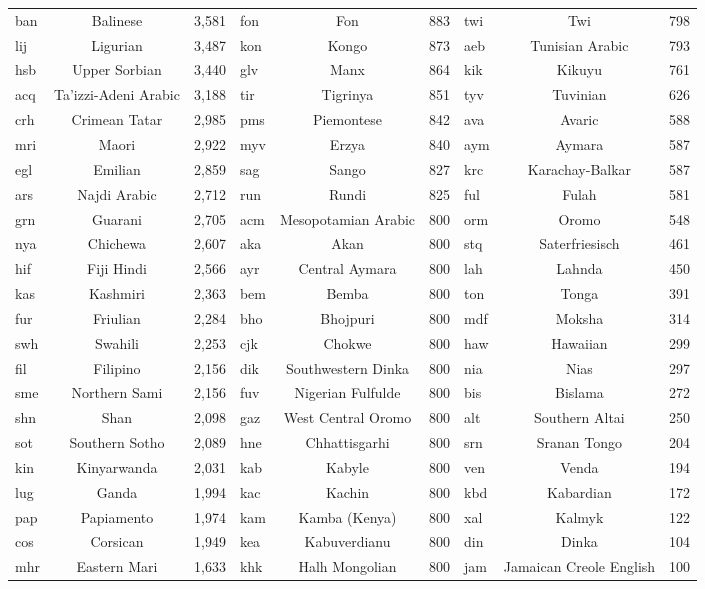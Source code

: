 \begin{table}[th]
{\begin{tabular}{m{1cm}<{\centering}cr|m{1cm}<{\centering}cr|m{1cm}<{\centering}cr}
ban & Balinese & 3,581 & fon & Fon & 883 & twi & Twi & 798 \\
lij & Ligurian & 3,487 & kon & Kongo & 873 & aeb & Tunisian Arabic & 793 \\
hsb & Upper Sorbian & 3,440 & glv & Manx & 864 & kik & Kikuyu & 761 \\
acq & Ta'izzi-Adeni Arabic & 3,188 & tir & Tigrinya & 851 & tyv & Tuvinian & 626 \\
crh & Crimean Tatar & 2,985 & pms & Piemontese & 842 & ava & Avaric & 588 \\
mri & Maori & 2,922 & myv & Erzya & 840 & aym & Aymara & 587 \\
egl & Emilian & 2,859 & sag & Sango & 827 & krc & Karachay-Balkar & 587 \\
ars & Najdi Arabic & 2,712 & run & Rundi & 825 & ful & Fulah & 581 \\
grn & Guarani & 2,705 & acm & Mesopotamian Arabic & 800 & orm & Oromo & 548 \\
nya & Chichewa & 2,607 & aka & Akan & 800 & stq & Saterfriesisch & 461 \\
hif & Fiji Hindi & 2,566 & ayr & Central Aymara & 800 & lah & Lahnda & 450 \\
kas & Kashmiri & 2,363 & bem & Bemba & 800 & ton & Tonga & 391 \\
fur & Friulian & 2,284 & bho & Bhojpuri & 800 & mdf & Moksha & 314 \\
swh & Swahili & 2,253 & cjk & Chokwe & 800 & haw & Hawaiian & 299 \\
fil & Filipino & 2,156 & dik & Southwestern Dinka & 800 & nia & Nias & 297 \\
sme & Northern Sami & 2,156 & fuv & Nigerian Fulfulde & 800 & bis & Bislama & 272 \\
shn & Shan & 2,098 & gaz & West Central Oromo & 800 & alt & Southern Altai & 250 \\
sot & Southern Sotho & 2,089 & hne & Chhattisgarhi & 800 & srn & Sranan Tongo & 204 \\
kin & Kinyarwanda & 2,031 & kab & Kabyle & 800 & ven & Venda & 194 \\
lug & Ganda & 1,994 & kac & Kachin & 800 & kbd & Kabardian & 172 \\
pap & Papiamento & 1,974 & kam & Kamba (Kenya) & 800 & xal & Kalmyk & 122 \\
cos & Corsican & 1,949 & kea & Kabuverdianu & 800 & din & Dinka & 104 \\
mhr & Eastern Mari & 1,633 & khk & Halh Mongolian & 800 & jam & Jamaican Creole English & 100 \\

\end{tabular}}
\end{table}
